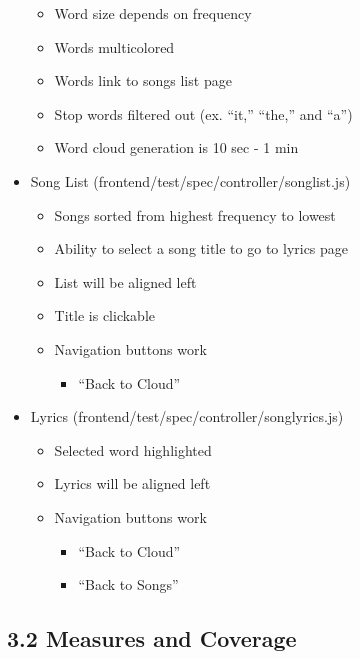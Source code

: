 \documentclass[]{article}
\begin{document}
\begin{itemize}
  \begin{itemize}
  \itemsep1pt\parskip0pt
  \item
    Word size depends on frequency
  \item
    Words multicolored
  \item
    Words link to songs list page
  \item
    Stop words filtered out (ex. ``it,'' ``the,'' and ``a'')
  \item
    Word cloud generation is 10 sec - 1 min
  \end{itemize}
\item
  Song List (frontend/test/spec/controller/songlist.js)

  \begin{itemize}
  \itemsep1pt\parskip0pt
  \item
    Songs sorted from highest frequency to lowest
  \item
    Ability to select a song title to go to lyrics page
  \item
    List will be aligned left
  \item
    Title is clickable
  \item
    Navigation buttons work

    \begin{itemize}
    \itemsep1pt\parskip0pt
    \item
      ``Back to Cloud''
    \end{itemize}
  \end{itemize}
\item
  Lyrics (frontend/test/spec/controller/songlyrics.js)

  \begin{itemize}
  \itemsep1pt\parskip0pt
  \item
    Selected word highlighted
  \item
    Lyrics will be aligned left
  \item
    Navigation buttons work

    \begin{itemize}
    \itemsep1pt\parskip0pt
    \item
      ``Back to Cloud''
    \item
      ``Back to Songs''
    \end{itemize}
  \end{itemize}
\end{itemize}

\subsection{\textbf{3.2 Measures and
Coverage}}\label{measures-and-coverage-1}
\end{document}
